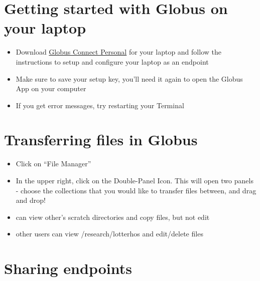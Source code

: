 \documentclass[
  letterpaper,
  DIV=11,
  numbers=noendperiod]{scrreprt}
\begin{document}
\hypertarget{getting-started-with-globus-on-your-laptop}{%
\section*{\texorpdfstring{\textbf{Getting started with Globus on your
laptop}}{Getting started with Globus on your laptop}}\label{getting-started-with-globus-on-your-laptop}}

\begin{itemize}
\item
  Download \href{https://www.globus.org/globus-connect-personal}{Globus
  Connect Personal} for your laptop and follow the instructions to setup
  and configure your laptop as an endpoint
\item
  Make sure to save your setup key, you'll need it again to open the
  Globus App on your computer
\item
  If you get error messages, try restarting your Terminal
\end{itemize}

\hypertarget{transferring-files-in-globus}{%
\section*{\texorpdfstring{\textbf{Transferring files in
Globus}}{Transferring files in Globus}}\label{transferring-files-in-globus}}

\begin{itemize}
\item
  Click on ``File Manager''
\item
  In the upper right, click on the Double-Panel Icon. This will open two
  panels - choose the collections that you would like to transfer files
  between, and drag and drop!
\item
  can view other's scratch directories and copy files, but not edit
\item
  other users can view /research/lotterhos and edit/delete files
\end{itemize}

\hypertarget{sharing-endpoints}{%
\section*{\texorpdfstring{\textbf{Sharing
endpoints}}{Sharing endpoints}}\label{sharing-endpoints}}
\end{document}
